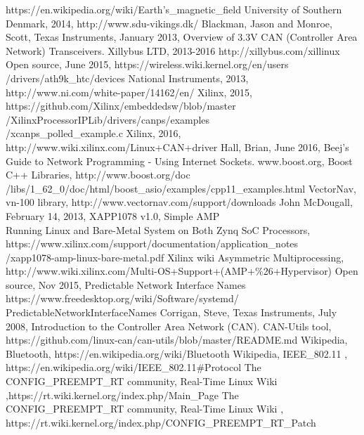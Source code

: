 \begin{thebibliography}{11} %
		https://en.wikipedia.org/wiki/Earth's\_magnetic\_field
		University of Southern Denmark, 2014, http://www.sdu-vikings.dk/
		Blackman, Jason and Monroe, Scott, Texas Instruments, January 2013, Overview of 3.3V CAN (Controller Area Network) Transceivers.
		Xillybus LTD, 2013-2016 http://xillybus.com/xillinux
		Open source, June 2015, https://wireless.wiki.kernel.org/en/users\\
		/drivers/ath9k\_htc/devices
		National Instruments, 2013, http://www.ni.com/white-paper/14162/en/
		Xilinx, 2015, https://github.com/Xilinx/embeddedsw/blob/master\\
		/XilinxProcessorIPLib/drivers/canps/examples\\
		/xcanps\_polled\_example.c
		Xilinx, 2016, http://www.wiki.xilinx.com/Linux+CAN+driver
		Hall, Brian, June 2016, Beej's Guide to Network Programming - Using Internet Sockets.
		www.boost.org, Boost C++ Libraries, http://www.boost.org/doc \\
		/libs/1\_62\_0/doc/html/boost\_asio/examples/cpp11\_examples.html
		VectorNav, vn-100 library, http://www.vectornav.com/support/downloads
		John McDougall, February 14, 2013, XAPP1078 v1.0, Simple AMP\\
		Running Linux and Bare-Metal System on Both Zynq SoC Processors,\\
		https://www.xilinx.com/support/documentation/application\_notes\\
		/xapp1078-amp-linux-bare-metal.pdf
		Xilinx wiki Asymmetric Multiprocessing,\\
		http://www.wiki.xilinx.com/Multi-OS+Support+(AMP+\%26+Hypervisor)
		Open source, Nov 2015, Predictable Network Interface Names \\
		https://www.freedesktop.org/wiki/Software/systemd/\\
		PredictableNetworkInterfaceNames
			Corrigan, Steve, Texas Instruments, July 2008, Introduction to the Controller Area Network (CAN).
			CAN-Utils tool, https://github.com/linux-can/can-utils/blob/master/README.md
			Wikipedia, Bluetooth, https://en.wikipedia.org/wiki/Bluetooth
			Wikipedia, IEEE\_802.11 , https://en.wikipedia.org/wiki/IEEE\_802.11\#Protocol
			The CONFIG\_PREEMPT\_RT community, Real-Time Linux Wiki ,https://rt.wiki.kernel.org/index.php/Main\_Page
			The CONFIG\_PREEMPT\_RT community, Real-Time Linux Wiki , https://rt.wiki.kernel.org/index.php/CONFIG\_PREEMPT\_RT\_Patch
\end{thebibliography}
